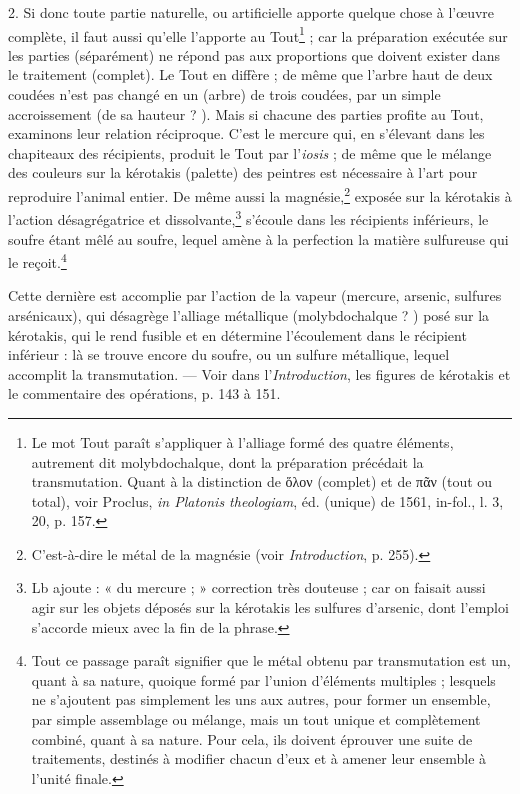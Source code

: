 \documentclass[a4paper, 11pt, oneside, polutonikogreek, french]{article}
\begin{document}
2. Si donc toute partie naturelle, ou artificielle apporte quelque chose à l'œuvre complète, il faut aussi qu'elle l'apporte au Tout\footnote{Le mot Tout paraît s'appliquer à l'alliage formé des quatre éléments, autrement dit molybdochalque, dont la préparation précédait la transmutation. Quant à la distinction de ὅλον (complet) et de πᾶν (tout ou total), voir Proclus, \emph{in Platonis theologiam}, éd. (unique) de 1561, in-fol., l. 3, 20, p. 157.} ; car la préparation exécutée sur les parties (séparément) ne répond pas aux proportions que doivent exister dans le traitement (complet). Le Tout en diffère ; de même que l'arbre haut de deux coudées n'est pas changé en un (arbre) de trois coudées, par un simple accroissement (de sa hauteur ? ). Mais si chacune des parties profite au Tout, examinons leur relation réciproque. C'est le mercure qui, en s'élevant dans les chapiteaux des récipients, produit le Tout par l'\emph{iosis} ; de même que le mélange des couleurs sur la kérotakis (palette) des peintres est nécessaire à l'art pour reproduire l'animal entier. De même aussi la magnésie,\footnote{C'est-à-dire le métal de la magnésie (voir \emph{Introduction}, p. 255).} exposée sur la kérotakis à l'action désagrégatrice et dissolvante,\footnote{Lb ajoute : « du mercure ; » correction très douteuse ; car on faisait aussi agir sur les objets déposés sur la kérotakis les sulfures d'arsenic, dont l'emploi s'accorde mieux avec la fin de la phrase.} s'écoule dans les récipients inférieurs, le soufre étant mêlé au soufre, lequel amène à la perfection la matière sulfureuse qui le reçoit.\footnote{Tout ce passage paraît signifier que le métal obtenu par transmutation est un, quant à sa nature, quoique formé par l'union d'éléments multiples ; lesquels ne s'ajoutent pas simplement les uns aux autres, pour former un ensemble, par simple assemblage ou mélange, mais un tout unique et complètement combiné, quant à sa nature. Pour cela, ils doivent éprouver une suite de traitements, destinés à modifier chacun d'eux et à amener leur ensemble à l'unité finale.  }

Cette dernière est accomplie par l'action de la vapeur (mercure, arsenic, sulfures arsénicaux), qui désagrège l'alliage métallique (molybdochalque ? ) posé sur la kérotakis, qui le rend fusible et en détermine l'écoulement dans le récipient inférieur : là se trouve encore du soufre, ou un sulfure métallique, lequel accomplit la transmutation. --- Voir dans l'\emph{Introduction}, les figures de kérotakis et le commentaire des opérations, p. 143 à 151.
\end{document}
